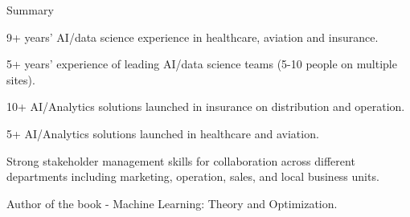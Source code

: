 \documentclass{resume} %
\begin{document}

\begin{rSection}{Summary} 

\begin{rSubsection}{}{}{}{}
\item 9+ years' AI/data science experience in healthcare, aviation and insurance.
\item 5+ years' experience of leading AI/data science teams (5-10 people on multiple sites).
\item 10+ AI/Analytics solutions launched in insurance on distribution and operation.
\item 5+ AI/Analytics solutions launched in healthcare and aviation.
\item Strong stakeholder management skills for collaboration across different departments including marketing, operation, sales, and local business units.
\item Author of the book - Machine Learning: Theory and Optimization.
\end{rSubsection}


\end{rSection}

\end{document}
